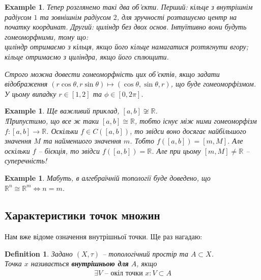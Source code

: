 \documentclass[a4paper, 10pt]{article}
\theoremstyle{theoremdd}
\newtheorem{definition}[theorem]{Definition}
\newtheorem{example}[theorem]{Example}
\begin{document}
\begin{example}
Тепер розглянемо такі два об'єкти. Перший: кільце з внутрішнім радіусом $1$ та зовнішнім радіусом $2$, для зручності розташуємо центр на початку координат. Другий: циліндр без двох основ. Інтуїтивно вони будуть гомеоморфними, тому що:\\
циліндр отримаємо з кільця, якщо його кільце намагатися розтягнути вгору;\\
кільце отримаємо з циліндра, якщо його сплющити.
\begin{figure}[H]
\centering
{}
\qquad
{}
\end{figure}
\noindent
Строго можна довести гомеоморфність цих об'єктів, якщо задати відображення $(r \cos \theta, r \sin \theta) \mapsto (\cos \theta, \sin \theta,r)$, що буде гомеоморфізмом. У цьому випадку $r \in [1,2]$ та $\phi \in [0,2\pi]$.
\end{example}

\begin{example}
Ще важливий приклад, $[a,b] \not\cong \mathbb{R}$.\\
!Припустимо, що все ж таки $[a,b] \cong \mathbb{R}$, тобто існує між ними гомеоморфізм $f \colon [a,b] \to \mathbb{R}$. Оскільки $f \in C([a,b])$, то звідси воно досягає найбільшого значення $M$ та найменшого значення $m$. Тобто $f([a,b]) = [m,M]$. Але оскільки $f$ -- бієкція, то звідси $f([a,b]) = \mathbb{R}$. Але при цьому $[m,M] \neq \mathbb{R}$ -- суперечність!
\end{example}

\begin{example}
Мабуть, в алгебраїчній топології буде доведено, що $\mathbb{R}^n \cong \mathbb{R}^m \iff n = m$.
\end{example}

\subsection{Характеристики точок множин}
\noindent Нам вже відоме означення внутрішньої точки. Ще раз нагадаю:
\begin{definition}
Задано $(X,\tau)$ -- топологічний простір та $A \subset X$.\\
Точка $x$ називається \textbf{внутрішньою для} $A$, якщо
\begin{align*}
\exists V \text{ -- окіл точки } x: V \subset A
\end{align*}
\end{definition}
\end{document}
